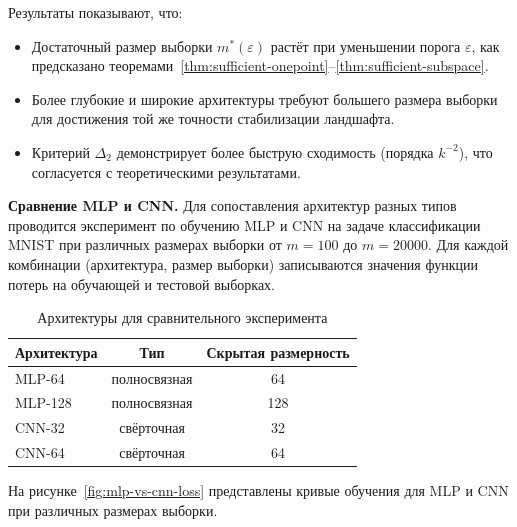 Результаты показывают, что:
\begin{itemize}
    \item Достаточный размер выборки $m^*(\varepsilon)$ растёт при уменьшении порога $\varepsilon$, как предсказано теоремами~\ref{thm:sufficient-onepoint}--\ref{thm:sufficient-subspace}.
    \item Более глубокие и широкие архитектуры требуют большего размера выборки для достижения той же точности стабилизации ландшафта.
    \item Критерий $\Delta_2$ демонстрирует более быструю сходимость (порядка $k^{-2}$), что согласуется с теоретическими результатами.
\end{itemize}

\textbf{Сравнение MLP и CNN.} Для сопоставления архитектур разных типов проводится эксперимент по обучению MLP и CNN на задаче классификации MNIST при различных размерах выборки от $m = 100$ до $m = 20000$. Для каждой комбинации (архитектура, размер выборки) записываются значения функции потерь на обучающей и тестовой выборках.

\begin{table}[ht]
    \centering
    \caption{Архитектуры для сравнительного эксперимента}
    \label{tab:scaling-comparison-architectures}
    \begin{tabular}{|l|c|c|}
        \hline
        Архитектура & Тип & Скрытая размерность \\
        \hline
        MLP-64 & полносвязная & 64 \\
        MLP-128 & полносвязная & 128 \\
        CNN-32 & свёрточная & 32 \\
        CNN-64 & свёрточная & 64 \\
        \hline
    \end{tabular}
\end{table}

На рисунке~\ref{fig:mlp-vs-cnn-loss} представлены кривые обучения для MLP и CNN при различных размерах выборки.


